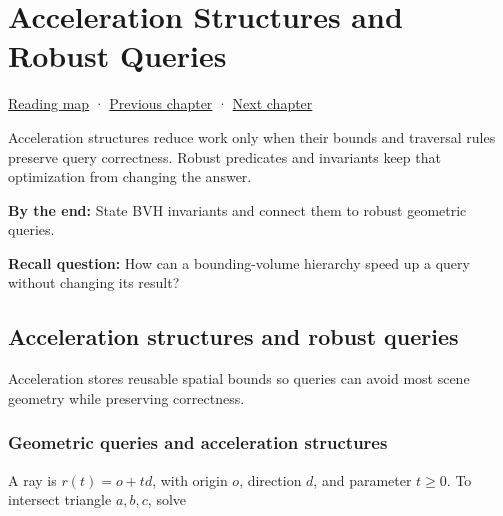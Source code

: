 \chapter{Acceleration Structures and Robust Queries}\label{04-visual-computing-ii-ch029-acceleration-structures-and-robust-queries}\hypertarget{04-visual-computing-ii-ch029}{}\label{stagechapter:04-visual-computing-ii-ch029}

\hypertarget{04-visual-computing-ii-ch029-acceleration-structures-and-robust-queries}{}

\hyperref[volume-reading-map]{Reading map} · \hyperref[04-visual-computing-ii-ch028-visibility-queries-and-ray-intersections]{Previous chapter} · \hyperref[04-visual-computing-ii-ch030-mesh-operators-boundaries-and-diffusion]{Next chapter}

Acceleration structures reduce work only when their bounds and traversal rules preserve query correctness. Robust predicates and invariants keep that optimization from changing the answer.

\textbf{By the end:} State BVH invariants and connect them to robust geometric queries.

\textbf{Recall question:} How can a bounding-volume hierarchy speed up a query without changing its result?

\section{Acceleration structures and robust queries}\label{04-visual-computing-ii-ch029-acceleration-structures-and-robust-queries-1}

\hypertarget{04-visual-computing-ii-ch029-acceleration-structures-and-robust-queries-1}{}

Acceleration stores reusable spatial bounds so queries can avoid most scene geometry while preserving correctness.

\subsection{Geometric queries and acceleration structures}\label{04-visual-computing-ii-ch029-geometric-queries-and-acceleration-structures}

\hypertarget{04-visual-computing-ii-ch029-geometric-queries-and-acceleration-structures}{}

A ray is \(r(t)=o+td\), with origin \(o\), direction \(d\), and parameter \(t\ge0\). To intersect triangle \(a,b,c\), solve

